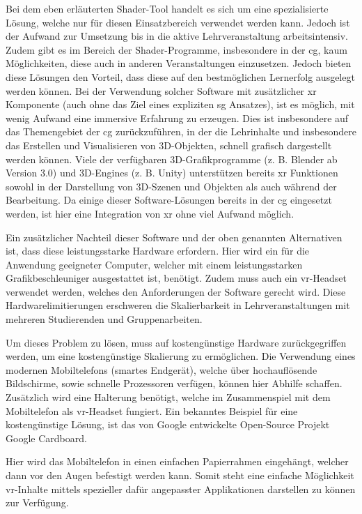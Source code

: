 \documentclass[conference]{IEEEtran}
\begin{document}
Bei dem eben erläuterten Shader-Tool handelt es sich um eine spezialisierte Lösung, welche nur für diesen Einsatzbereich
verwendet werden kann. Jedoch ist der Aufwand zur Umsetzung bis in die aktive Lehrveranstaltung arbeitsintensiv.
Zudem gibt es im Bereich der Shader-Programme, insbesondere in der \gls{cg}, kaum Möglichkeiten, diese auch in anderen Veranstaltungen einzusetzen.
Jedoch bieten diese Lösungen den Vorteil, dass diese auf den bestmöglichen Lernerfolg ausgelegt werden können.
Bei der Verwendung solcher Software mit zusätzlicher \gls{xr} Komponente (auch ohne das Ziel eines expliziten \gls{sg} Ansatzes), ist es möglich, mit wenig Aufwand eine immersive Erfahrung zu erzeugen.
Dies ist insbesondere auf das Themengebiet der \gls{cg} zurückzuführen, in der die Lehrinhalte und insbesondere das Erstellen und Visualisieren von 3D-Objekten, schnell grafisch dargestellt werden können.
Viele der verfügbaren 3D-Grafikprogramme (z. B. Blender\cite{blender} ab Version 3.0) und 3D-Engines (z. B. Unity\cite{unity3d}) unterstützen bereits \gls{xr} Funktionen sowohl in der Darstellung von 3D-Szenen und Objekten als auch während der Bearbeitung.
Da einige dieser Software-Lösungen bereits in der \gls{cg} eingesetzt werden, ist hier eine Integration von \gls{xr} ohne viel Aufwand möglich.


Ein zusätzlicher Nachteil dieser Software und der oben genannten Alternativen ist, dass diese leistungsstarke Hardware erfordern.
Hier wird ein für die Anwendung geeigneter Computer, welcher mit einem leistungsstarken Grafikbeschleuniger ausgestattet ist, benötigt.
Zudem muss auch ein \gls{vr}-Headset verwendet werden, welches den Anforderungen der Software gerecht wird.
Diese Hardwarelimitierungen erschweren die Skalierbarkeit in Lehrveranstaltungen mit mehreren Studierenden und Gruppenarbeiten.

Um dieses Problem zu lösen, muss auf kostengünstige Hardware zurückgegriffen werden, um eine kostengünstige Skalierung zu ermöglichen.
Die Verwendung eines modernen Mobiltelefons (smartes Endgerät), welche über hochauflösende Bildschirme, sowie schnelle Prozessoren verfügen, können hier Abhilfe schaffen.
Zusätzlich wird eine Halterung benötigt, welche im Zusammenspiel mit dem Mobiltelefon als \gls{vr}-Headset fungiert.
Ein bekanntes Beispiel für eine kostengünstige Lösung, ist das von Google entwickelte Open-Source Projekt Google Cardboard\cite{googlecardboard}.

Hier wird das Mobiltelefon in einen einfachen Papierrahmen eingehängt, welcher dann vor den Augen befestigt werden kann.
Somit steht eine einfache Möglichkeit \gls{vr}-Inhalte mittels spezieller dafür angepasster Applikationen darstellen zu können zur Verfügung.
\end{document}
